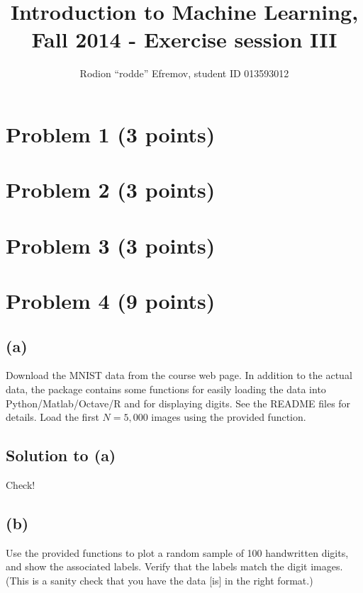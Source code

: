 \documentclass[10pt]{article}
\title{Introduction to Machine Learning, Fall 2014 - Exercise session III}
\author{Rodion ``rodde'' Efremov, student ID 013593012}
\begin{document}
 \maketitle

\section*{Problem 1 (3 points)}

\section*{Problem 2 (3 points)}

\section*{Problem 3 (3 points)}

\section*{Problem 4 (9 points)}
\subsection*{(a)}
\color{blue}
Download the MNIST data from the course web page. In addition to the actual data, the package contains some functions for easily loading the data into Python/Matlab/Octave/R and for displaying digits. See the README files for details. Load the first $N=5,000$ images using the provided function.
\color{black}

\subsection*{Solution to (a)} 
Check!

\subsection*{(b)}
\color{blue}
Use the provided functions to plot a random sample of 100 handwritten digits, and show the associated labels. Verify that the labels match the digit images. (This is a sanity check that you have the data [is] in the right format.)
\color{black}
\end{document}
